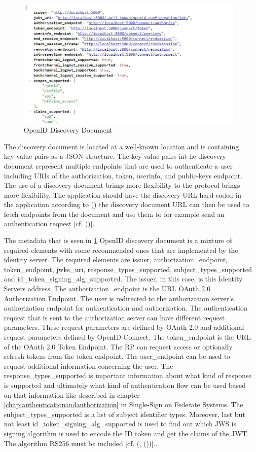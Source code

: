 \begin{figure}[h]
	\centering
	\includegraphics[width=0.8\linewidth]{images/openid-discovery-document}
	\caption{OpenID Discovery Document}
	\label{fig:openid-discovery-document}
\end{figure}
The discovery document is located at a well-known location and is containing key-value pairs as a JSON structure. The key-value pairs int he discovery document represent multiple endpoints that are used to authenticate a user including URIs of the authorization, token, userinfo, and public-keys endpoint. The use of a discovery document brings more flexibility to the protocol brings more flexibility. The application should have the discovery URL hard-coded in the application according to (\cite{Google:2018:IdentityPlatform}) the discovery document URL can then be used to fetch endpoints from the document and use them to for example send an authentication request [cf. (\cite{Google:2018:IdentityPlatform})].

The metadata that is seen in \ref{fig:openid-discovery-document} OpenID discovery document is a mixture of required elements with some recommended ones that are implemented by the identity server. The required elements are issuer, authorization\_endpoint, token\_endpoint, jwks\_uri, response\_types\_supported, subject\_types\_supported and id\_token\_signing\_alg\_supported. The issuer, in this case, is this Identity Servers address. The authorization\_endpoint is the URL OAuth 2.0 Authorization Endpoint. The user is redirected to the authorization server's authorization endpoint for authentication and authorization. The authentication request that is sent to the authorization server can have different request parameters. These request parameters are defined by OAuth 2.0 and additional request parameters defined by OpenID Connect. The token\_endpoint is the URL of the OAuth 2.0 Token Endpoint. The RP can request access or optionally refresh tokens from the token endpoint. The user\_endpoint can be used to request additional information concerning the user. The response\_types\_supported is important information about what kind of response is supported and ultimately what kind of authentication flow can be used based on that information like described in chapter \ref{chap:authenticationandauthorization} in Single-Sign on Federate Systems. The subject\_types\_supported is a list of subject identifier types. Moreover, last but not least id\_token\_signing\_alg\_supported is used to find out which JWS is signing algorithm is used to encode the ID token and get the claims of the JWT. The algorithm RS256 must be included [cf. (\cite{Sakimura:OIDCC}, (\cite{Sakimura:OIDCD}))].. 


